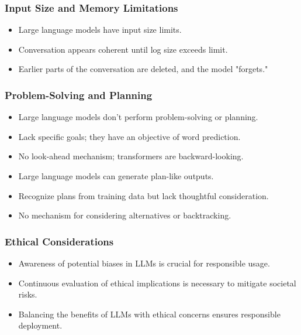 \begin{frame}[fragile]\frametitle{Input Size and Memory Limitations}
\begin{itemize}
    \item Large language models have input size limits.
    \item Conversation appears coherent until log size exceeds limit.
    \item Earlier parts of the conversation are deleted, and the model "forgets."
\end{itemize}
\end{frame}

\begin{frame}[fragile]\frametitle{Problem-Solving and Planning}
\begin{itemize}
    \item Large language models don't perform problem-solving or planning.
    \item Lack specific goals; they have an objective of word prediction.
    \item No look-ahead mechanism; transformers are backward-looking.
    \item Large language models can generate plan-like outputs.
    \item Recognize plans from training data but lack thoughtful consideration.
    \item No mechanism for considering alternatives or backtracking.
\end{itemize}
\end{frame}



\begin{frame}[fragile]
  \frametitle{Ethical Considerations}

  \begin{itemize}
    \item Awareness of potential biases in LLMs is crucial for responsible usage.
    \item Continuous evaluation of ethical implications is necessary to mitigate societal risks.
    \item Balancing the benefits of LLMs with ethical concerns ensures responsible deployment.

  \end{itemize}


\end{frame}


